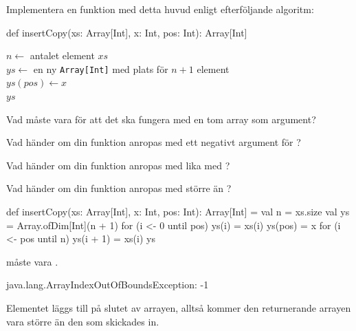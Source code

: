 \Subtask Implementera en funktion med detta huvud enligt efterföljande algoritm:
\begin{Code}
def insertCopy(xs: Array[Int], x: Int, pos: Int): Array[Int]
\end{Code}


\begin{algorithm}[H]

 $n \leftarrow$ antalet element $xs$\\
 $ys \leftarrow$ en ny \texttt{Array[Int]} med plats för $n+1$ element \\
 $ys(pos) \leftarrow x$ \\
 \Return $ys$
\end{algorithm}


\Subtask Vad måste  vara för att det ska fungera med en tom array som argument?

\Subtask Vad händer om din funktion anropas med ett negativt argument för ?

\Subtask Vad händer om din funktion anropas med  lika med ?

\Subtask Vad händer om din funktion anropas med  större än ?

\SOLUTION

\TaskSolved \what

\SubtaskSolved  \begin{Code}
def insertCopy(xs: Array[Int], x: Int, pos: Int): Array[Int] = {
  val n = xs.size
  val ys = Array.ofDim[Int](n + 1)
  for (i <- 0 until pos) ys(i) = xs(i)
  ys(pos) = x
  for (i <- pos until n) ys(i + 1) = xs(i)
  ys
}
\end{Code}

\SubtaskSolved  {} måste vara .

\SubtaskSolved  \begin{REPL}
java.lang.ArrayIndexOutOfBoundsException: -1
\end{REPL}

\SubtaskSolved  Elementet  läggs till på slutet av arrayen, alltså kommer den returnerande arrayen vara större än den som skickades in.

